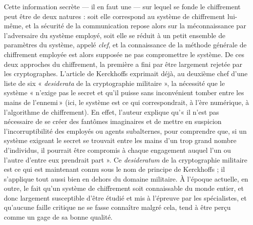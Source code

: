 



Cette information secrète --- il en faut une --- sur lequel se fonde le chiffrement peut être de deux natures : soit elle
correspond au système de chiffrement lui-même, et la sécurité de la communication repose alors
sur la méconnaissance par l’adversaire du système employé, soit elle se réduit à un petit ensemble de
paramètres du système, appelé \emph{clef}, et la connaissance de la méthode générale de chiffrement
employée est alors supposée ne pas compromettre le système.
De ces deux approches du chiffrement, la première a fini par être largement rejetée par les
cryptographes.
L’article de Kerckhoffs exprimait déjà, au deuxième chef d’une liste de six « \emph{desiderata} de
la cryptographie militaire », la nécessité que le système « n’exige pas le secret et qu’il puisse
sans inconvénient tomber entre les mains de l’ennemi » (ici, le système est ce qui correspondrait, à
l’ère numérique, à l'algorithme de chiffrement).
En effet, l’auteur explique qu’« il n’est pas nécessaire de se créer des fantômes imaginaires et de mettre
en suspicion l’incorruptibilité des employés ou agents subalternes, pour comprendre que, si un
système exigeant le secret se trouvait entre les mains d’un trop grand nombre d’individus, il
pourrait être compromis à chaque engagement auquel l’un ou l’autre d’entre eux prendrait part ».
Ce \emph{desideratum} de la cryptographie militaire est ce qui est maintenant connu sous le nom de
principe de Kerckhoffs ; il s’applique tout aussi bien en dehors du domaine militaire.
À l’époque actuelle, en outre, le fait qu’un système de
chiffrement soit connaissable du monde entier, et donc largement susceptible d’être étudié et mis à
l’épreuve par les spécialistes, et qu’aucune faille critique ne se fasse connaître malgré cela, tend
à être perçu comme un gage de sa bonne qualité.

